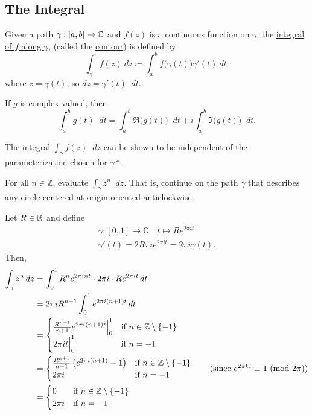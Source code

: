\documentclass[11pt]{article}
\newcommand*\dif{\mathop{}\!d}
\newcommand{\Mod}[1]{\ (\mathrm{mod}\ #1)}
\begin{document}
\subsection{The Integral}
\begin{definition}
	Given a path $\gamma:[a,b] \to \mathbb{C}$ and $f(z)$ is a continuous function on
	$\gamma$, the \underline{integral of $f$ along $\gamma$}, (called the
	\underline{contour}) is defined by
	\begin{equation*}
		\int_\gamma f(z)\>dz \coloneqq \int^b_a f\big(\gamma(t)\big)\gamma'(t)\>dt.
	\end{equation*}
	where $z = \gamma(t)$, so $dz = \gamma'(t)\dif t$.
\end{definition}
\begin{remark}
	If $g$ is complex valued, then
	\begin{equation*}
		\int^b_a g(t)\dif t = \int^b_a \Re\big(g(t)\big)\dif t+i \int^b_a
		\Im\big(g(t)\big)\dif t.
	\end{equation*}
\end{remark}
\begin{remark}
	The integral $\int_\gamma f(z)\dif z$ can be shown to be independent of the
	parameterization chosen for $\gamma*$.
\end{remark}
\begin{example}\label{example1}
	For all $n \in \mathbb{Z}$, evaluate $\int_{\gamma} z^n \dif{z}$. That is,
	continue on the path $\gamma$ that describes any circle centered at origin
	oriented anticlockwise.
\end{example}
Let $R \in \mathbb{R}$ and define
\begin{gather*}
	\gamma: [0, 1] \to \mathbb{C} \quad t \mapsto Re^{2\pi i t} \\
	\gamma'(t) = 2R\pi i e^{2\pi i t} = 2 \pi i \gamma(t).
\end{gather*}
Then,
\begin{align*}
	\int_{\gamma} z^n \dif{z}
	&= \int_{0}^{1} R^ne^{2 \pi i n t} \cdot 2 \pi i \cdot Re^{2 \pi i t} \dif t \\
	&= 2 \pi i R^{n+1} \int_{0}^{1} e^{2 \pi i (n+1) t} \dif t \\
	&= \begin{cases}
	\frac{R^{n+1}}{n+1} e^{2 \pi i (n+1) t} \Big|_{0}^{1} & \text{if } n \in
	\mathbb{Z} \setminus \{-1\} \\ 2 \pi i t \Big|_{0}^{1} & \text{if } n = -1
\end{cases} \\
&= \begin{cases}
\frac{R^{n+1}}{n+1} \left(e^{2 \pi i (n+1)}-1 \right) & \text{if } n \in
\mathbb{Z} \setminus \{-1\} \\ 2 \pi i  & \text{if } n = -1
\end{cases} \tag{since $e^{2 \pi k i} \equiv 1 \Mod{2 \pi}$}\\
&= \begin{cases}
0   & \text{if } n \in \mathbb{Z} \setminus \{-1\} \\
2 \pi i & \text{if } n = -1
\end{cases}
\end{align*}
\end{document}
